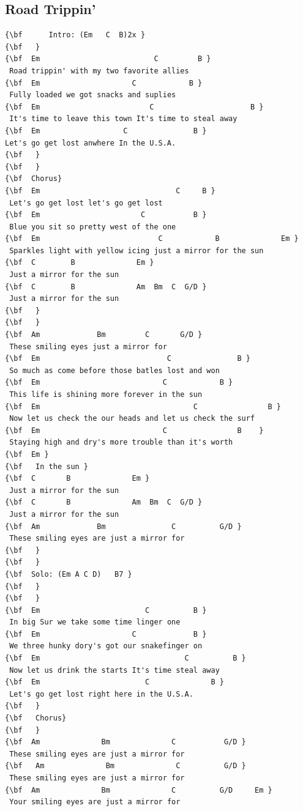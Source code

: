 \documentclass[a4paper]{article}
\begin{document}
\subsection{Road Trippin'}
\begin{Verbatim}[commandchars=\\\{\}]
{\bf      Intro: (Em   C  B)2x }
{\bf   }
{\bf  Em                          C         B }
 Road trippin' with my two favorite allies 
{\bf  Em                     C            B }
 Fully loaded we got snacks and suplies 
{\bf  Em                         C                      B }
 It's time to leave this town It's time to steal away 
{\bf  Em                   C               B }
Let's go get lost anwhere In the U.S.A. 
{\bf   }
{\bf   }
{\bf  Chorus}
{\bf  Em                               C     B }
 Let's go get lost let's go get lost 
{\bf  Em                       C           B }
 Blue you sit so pretty west of the one 
{\bf  Em                           C            B              Em }
 Sparkles light with yellow icing just a mirror for the sun  
{\bf  C        B              Em }
 Just a mirror for the sun 
{\bf  C        B              Am  Bm  C  G/D }
 Just a mirror for the sun 
{\bf   }
{\bf   }
{\bf  Am             Bm         C       G/D }
 These smiling eyes just a mirror for 
{\bf  Em                             C               B }
 So much as come before those batles lost and won 
{\bf  Em                            C            B }
 This life is shining more forever in the sun 
{\bf  Em                                   C                B }
 Now let us check the our heads and let us check the surf 
{\bf  Em                            C                B    }
 Staying high and dry's more trouble than it's worth 
{\bf  Em }
{\bf   In the sun }
{\bf  C       B              Em }
 Just a mirror for the sun 
{\bf  C       B              Am  Bm  C  G/D }
 Just a mirror for the sun 
{\bf  Am             Bm               C          G/D }
 These smiling eyes are just a mirror for 
{\bf   }
{\bf   }
{\bf  Solo: (Em A C D)   B7 }
{\bf   }
{\bf   }
{\bf  Em                        C          B }
 In big Sur we take some time linger one 
{\bf  Em                     C             B }
 We three hunky dory's got our snakefinger on 
{\bf  Em                                 C          B }
 Now let us drink the starts It's time steal away 
{\bf  Em                        C              B }
 Let's go get lost right here in the U.S.A. 
{\bf   }
{\bf   Chorus}
{\bf   }
{\bf  Am              Bm              C           G/D }
 These smiling eyes are just a mirror for 
{\bf   Am              Bm              C          G/D }
 These smiling eyes are just a mirror for 
{\bf  Am              Bm              C          G/D     Em }
 Your smiling eyes are just a mirror for 

\end{Verbatim}
\newpage
\end{document}
